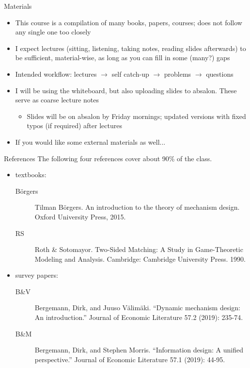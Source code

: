 \documentclass[english,10pt
,aspectratio=169
]{beamer}
\begin{document}
\begin{frame}{Materials}
	\begin{itemize}
		\item This course is a compilation of many books, papers, courses; does not follow any single one too closely
		\item I expect lectures (sitting, listening, taking notes, reading slides afterwards) to be sufficient, material-wise, as long as you can fill in some (many?) gaps
		\item Intended workflow: lectures $\to$ self catch-up $\to$ problems $\to$ questions
		\item I will be using the whiteboard, but also uploading slides to absalon. These serve as coarse lecture notes
		\begin{itemize}
			\item Slides will be on absalon by Friday mornings; updated versions with fixed typos (if required) after lectures
		\end{itemize}
		\item If you would like some external materials as well...
	\end{itemize}
\end{frame}


\begin{frame}{References}
	The following four references cover about 90\% of the class.
	\begin{itemize}
		\item textbooks:
		\begin{description}
			\item[B\"{o}rgers] Tilman B\"{o}rgers. An introduction to the theory of mechanism design. Oxford University Press, 2015.
			\item[RS] Roth \& Sotomayor. Two-Sided Matching: A Study in Game-Theoretic Modeling and Analysis. Cambridge: Cambridge University Press. 1990.
		\end{description}
		\item survey papers:
		\begin{description}
			\item[B\&V] Bergemann, Dirk, and Juuso Välimäki. ``Dynamic mechanism design: An introduction.'' Journal of Economic Literature 57.2 (2019): 235-74.
			\item[B\&M] Bergemann, Dirk, and Stephen Morris. ``Information design: A unified perspective.'' Journal of Economic Literature 57.1 (2019): 44-95. 
		\end{description}
	\end{itemize}
\end{frame}
\end{document}
